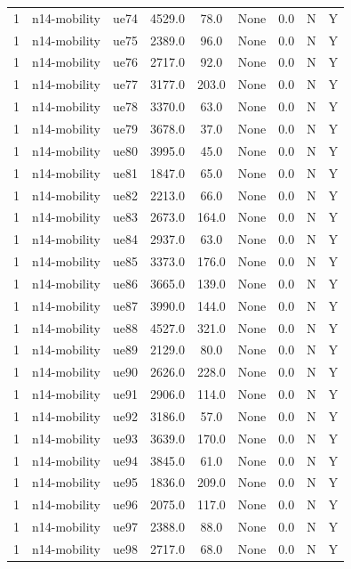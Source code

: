 \begin{table}[ht]
\begin{tabular}{|c|c|c|c|c|c|c|c|c|}
1 & n14-mobility & ue74 & 4529.0 & 78.0 & None & 0.0 & N & Y \\
1 & n14-mobility & ue75 & 2389.0 & 96.0 & None & 0.0 & N & Y \\
1 & n14-mobility & ue76 & 2717.0 & 92.0 & None & 0.0 & N & Y \\
1 & n14-mobility & ue77 & 3177.0 & 203.0 & None & 0.0 & N & Y \\
1 & n14-mobility & ue78 & 3370.0 & 63.0 & None & 0.0 & N & Y \\
1 & n14-mobility & ue79 & 3678.0 & 37.0 & None & 0.0 & N & Y \\
1 & n14-mobility & ue80 & 3995.0 & 45.0 & None & 0.0 & N & Y \\
1 & n14-mobility & ue81 & 1847.0 & 65.0 & None & 0.0 & N & Y \\
1 & n14-mobility & ue82 & 2213.0 & 66.0 & None & 0.0 & N & Y \\
1 & n14-mobility & ue83 & 2673.0 & 164.0 & None & 0.0 & N & Y \\
1 & n14-mobility & ue84 & 2937.0 & 63.0 & None & 0.0 & N & Y \\
1 & n14-mobility & ue85 & 3373.0 & 176.0 & None & 0.0 & N & Y \\
1 & n14-mobility & ue86 & 3665.0 & 139.0 & None & 0.0 & N & Y \\
1 & n14-mobility & ue87 & 3990.0 & 144.0 & None & 0.0 & N & Y \\
1 & n14-mobility & ue88 & 4527.0 & 321.0 & None & 0.0 & N & Y \\
1 & n14-mobility & ue89 & 2129.0 & 80.0 & None & 0.0 & N & Y \\
1 & n14-mobility & ue90 & 2626.0 & 228.0 & None & 0.0 & N & Y \\
1 & n14-mobility & ue91 & 2906.0 & 114.0 & None & 0.0 & N & Y \\
1 & n14-mobility & ue92 & 3186.0 & 57.0 & None & 0.0 & N & Y \\
1 & n14-mobility & ue93 & 3639.0 & 170.0 & None & 0.0 & N & Y \\
1 & n14-mobility & ue94 & 3845.0 & 61.0 & None & 0.0 & N & Y \\
1 & n14-mobility & ue95 & 1836.0 & 209.0 & None & 0.0 & N & Y \\
1 & n14-mobility & ue96 & 2075.0 & 117.0 & None & 0.0 & N & Y \\
1 & n14-mobility & ue97 & 2388.0 & 88.0 & None & 0.0 & N & Y \\
1 & n14-mobility & ue98 & 2717.0 & 68.0 & None & 0.0 & N & Y \\

\end{tabular}
\end{table}
